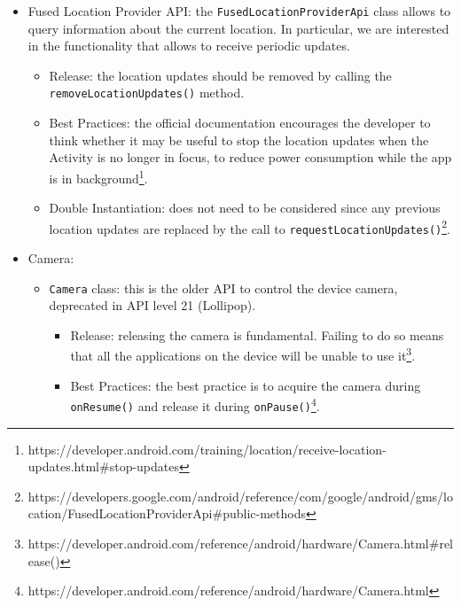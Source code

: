 \documentclass[11pt,a4paper,notitlepage]{article}
\begin{document}
\begin{itemize}
\begin{itemize}
		\item Best Practices: the official recommendation is to connect during \texttt{onStart()} and to disconnect during \texttt{onStop()}\footnote{https://developers.google.com/android/guides/api-client\#start\_a\_manually\_managed\_connection}.
		\item Double Instantiation: it is not a problem since the call to \texttt{connect()} returns immediately if the client is already connected or connecting\footnote{https://developers.google.com/android/reference/com/google/android/gms/common/api/GoogleApiClient\#public-methods}.
	\end{itemize}
	\item Fused Location Provider API: the \texttt{FusedLocationProviderApi} class allows to query information about the current location. In particular, we are interested in the functionality that allows to receive periodic updates.
	\begin{itemize}
		\item Release: the location updates should be removed by calling the \texttt{removeLocationUpdates()} method.
		\item Best Practices: the official documentation encourages the developer to think whether it may be useful to stop the location updates when the Activity is no longer in focus, to reduce power consumption while the app is in background\footnote{https://developer.android.com/training/location/receive-location-updates.html\#stop-updates}.
		\item Double Instantiation: does not need to be considered since any previous location updates are replaced by the call to \texttt{requestLocationUpdates()}\footnote{https://developers.google.com/android/reference/com/google/android/gms/location/FusedLocationProviderApi\#public-methods}.
	\end{itemize}
	\item Camera:
		\begin{itemize}
			\item \texttt{Camera} class: this is the older API to control the device camera, deprecated in API level 21 (Lollipop).
			\begin{itemize}
				\item Release: releasing the camera is fundamental. Failing to do so means that all the applications on the device will be unable to use it\footnote{https://developer.android.com/reference/android/hardware/Camera.html\#release()}.
				\item Best Practices: the best practice is to acquire the camera during \texttt{onResume()} and release it during \texttt{onPause()}\footnote{https://developer.android.com/reference/android/hardware/Camera.html}.

\end{itemize}
\end{itemize}
\end{itemize}
\end{document}
